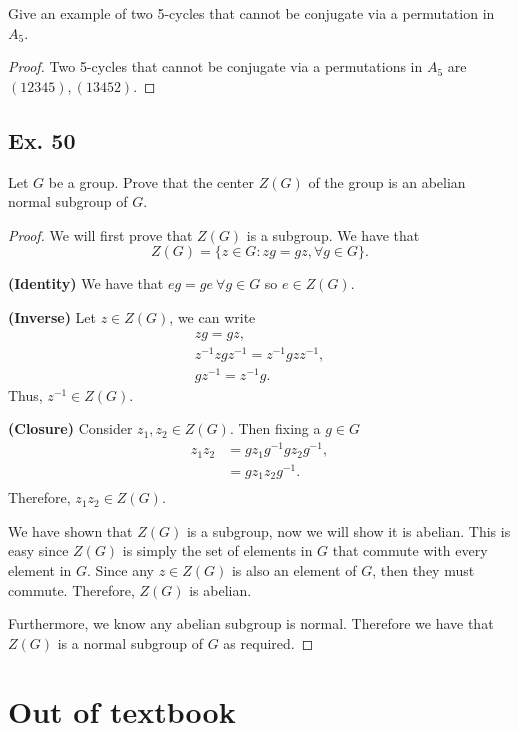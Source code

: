 \documentclass{article}
\newenvironment{hwproof}[1]
{
    #1
    \begin{proof}
}{
    \end{proof}
}
\begin{document}
\begin{hwproof}
    {
        Give an example of two 5-cycles that cannot be conjugate via a
        permutation in $A_5$.
    }
    Two 5-cycles that cannot be conjugate via a permutations in $A_5$ are
    $(12345), (13452)$.
\end{hwproof}


\subsection*{Ex. 50}
\begin{hwproof}
    {
        Let $G$ be a group. Prove that the center $Z(G)$ of the group is an abelian
        normal subgroup of $G$.
    }
    We will first prove that $Z(G)$ is a subgroup. We have that
    \begin{equation*}
        Z(G) = \{z \in G : zg = gz, \forall g \in G\}.
    \end{equation*}

    \textbf{(Identity)} We have that $eg = ge \ \forall g \in G$ so $e \in Z(G)$.

    \textbf{(Inverse)} Let $z \in Z(G)$, we can write
    \begin{gather*}
        zg = gz,\\
        z^{-1}zgz^{-1} = z^{-1}gzz^{-1}, \\
        gz^{-1} = z^{-1}g.
    \end{gather*}
    Thus, $z^{-1} \in Z(G)$.

    \textbf{(Closure)} Consider $z_1, z_2 \in Z(G)$. Then fixing a $g\in G$
    \begin{align*}
        z_1 z_2 & = gz_1 g^{-1}gz_2 g^{-1}, \\
                & = gz_1z_2 g^{-1}.         \\
    \end{align*}
    Therefore, $z_1z_2 \in Z(G)$.

    We have shown that $Z(G)$ is a subgroup, now we will show it is abelian.
    This is easy since $Z(G)$ is simply the set of elements in $G$ that
    commute with every element in $G$. Since any $z\in Z(G)$ is also an
    element of $G$, then they must commute. Therefore, $Z(G)$ is abelian.

    Furthermore, we know any abelian subgroup is normal. Therefore we have that
    $Z(G)$ is a normal subgroup of $G$ as required.

\end{hwproof}

\section*{Out of textbook}
\end{document}
